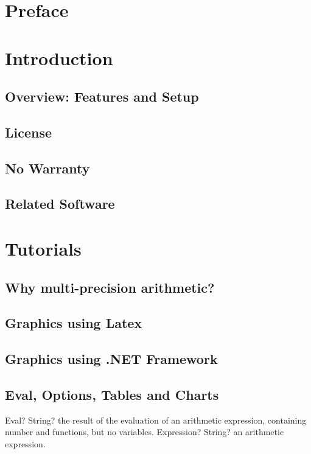\documentclass[12pt,a4paper,openany]{book}
\begin{document}
\chapter{Preface}

\chapter{Introduction}

\section{Overview: Features and Setup}

\section{License}

\section{No Warranty}

\section{Related Software}

\chapter{Tutorials}

\section{Why multi-precision arithmetic?}

\section{Graphics using Latex}

\section{Graphics using .NET Framework}

\section{Eval, Options, Tables and Charts}

\begin{mpFunctionsExtract}
\mpFunctionOne
{Eval? String?  the result of the evaluation of an arithmetic expression, containing number and functions, but no variables.}
{Expression? String? an arithmetic expression.}
\end{mpFunctionsExtract}
\end{document}
